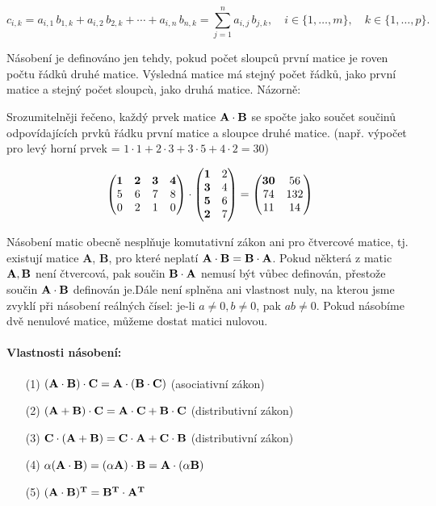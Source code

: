 $$
  c_{i,k} = a_{i,1}\,b_{1,k} + a_{i,2}\,b_{2,k} + \cdots + a_{i,n}\,b_{n,k} 
  = \sum_{j=1}^n a_{i,j}\,b_{j,k}, \quad 
  i\in\{1,\ldots,m\},\quad k\in\{1,\ldots,p\}.
$$

Násobení je definováno jen tehdy, pokud počet sloupců
první matice je roven počtu řádků druhé matice. Výsledná matice má
stejný počet řádků, jako první matice a stejný počet sloupcù, jako
druhá matice. Názorně:

Srozumitelněji řečeno, každý prvek matice $\bf A\cdot\bf B$ se spočte jako součet součinů odpovídajících prvků řádku první matice a sloupce druhé matice. (např. výpočet pro levý horní prvek = $1\cdot1 + 2\cdot3 + 3\cdot5 + 4\cdot2 = 30$)

$$
\begin{pmatrix}
  \bf1 & \bf2 & \bf3 & \bf4 \\
  5 & 6 & 7 & 8 \\
  0 & 2 & 1 & 0
 \end{pmatrix}
\cdot
\begin{pmatrix}
  \bf1 & 2 \\
  \bf3 & 4 \\
  \bf5 & 6 \\
  \bf2 & 7
 \end{pmatrix}
=
\begin{pmatrix}
  \bf30 & 56 \\
  74 & 132 \\
  11 & 14
 \end{pmatrix}
$$

Násobení matic obecně nesplňuje komutativní zákon ani pro čtvercové matice, tj. existují matice \textbf{A}, \textbf{B}, pro které neplatí $\bf A \cdot B = B \cdot A$. Pokud některá z matic $\bf A, B$ není čtvercová, pak součin $\bf B \cdot A$ nemusí být vůbec definován, přestože součin $\bf A \cdot B$ definován je.Dále není splněna ani vlastnost nuly, na kterou jsme zvyklí při násobení reálných čísel: je-li $a \neq 0, b \neq 0$, pak $ab \neq 0$. Pokud násobíme dvě nenulové matice, můžeme dostat matici nulovou.

\paragraph{Vlastnosti násobení:}

\begin{itemize}[topsep=5pt, itemsep=0pt]
	\item[(1)] $\bf (A \cdot B)  \cdot C = A \cdot (B \cdot C)$ (asociativní zákon)
	\item[(2)] $\bf (A + B)  \cdot C = A \cdot C + B \cdot C$ (distributivní zákon)
	\item[(3)] $\bf C \cdot (A + B) = C \cdot A + C \cdot B$ (distributivní zákon)
	\item[(4)] $\alpha (\bf A \cdot B) = (\alpha A) \cdot B = A \cdot (\alpha B)$
	\item[(5)] $(\bf A \cdot B)^T = B^T \cdot A^T$
\end{itemize}

